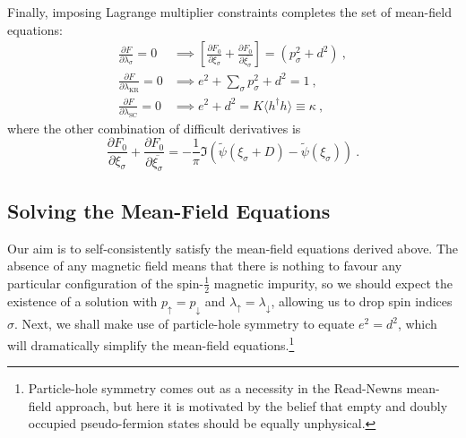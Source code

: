 
Finally, imposing Lagrange multiplier constraints completes the set of mean-field equations:
\begin{align}
\frac{\partial F}{\partial \lambda_{\sigma}} = 0 &\implies \left[ \frac{\partial F_{0}}{\partial \xi_{\sigma}} + \frac{\partial F_{0}}{\partial \overline{\xi_{\sigma}}} \right] = (p^2_{\sigma} + d^2) ~ , \label{eq:MF_lambda_sigma} \\
\frac{\partial F}{\partial \lambda_{\text{KR}}} = 0 &\implies e^2 + \sum_{\sigma} p^2_{\sigma} + d^2 = 1 ~ , \label{eq:MF_lambda_KR} \\
\frac{\partial F}{\partial \lambda_{\text{SC}}} = 0 &\implies e^2 + d^2 = K \langle h^{\dagger} h \rangle \equiv \kappa ~ , \label{eq:MF_lambda_SC}
\end{align}
where the other combination of difficult derivatives is
\begin{equation}
\frac{\partial F_{0}}{\partial \xi_{\sigma}} + \frac{\partial F_{0}}{\partial \overline{\xi_{\sigma}}} = - \frac{1}{\pi} \Im{( \widetilde{\psi}(\xi_{\sigma} + D) - \widetilde{\psi}(\xi_{\sigma}))} ~ .
\end{equation}




\subsection{Solving the Mean-Field Equations}
\label{subsec:solving_MF}

Our aim is to self-consistently satisfy the mean-field equations derived above. The absence of any magnetic field means that there is nothing to favour any particular configuration of the spin-$\frac{1}{2}$ magnetic impurity, so we should expect the existence of a solution with $ p_{\uparrow} = p_{\downarrow} $ and $ \lambda_{\uparrow} = \lambda_{\downarrow} $, allowing us to drop spin indices $ \sigma $. Next, we shall make use of particle-hole symmetry to equate $ e^2 = d^2 $, which will dramatically simplify the mean-field equations.\footnote{Particle-hole symmetry comes out as a necessity in the Read-Newns mean-field approach, but here it is motivated by the belief that empty and doubly occupied pseudo-fermion states should be equally unphysical.}

